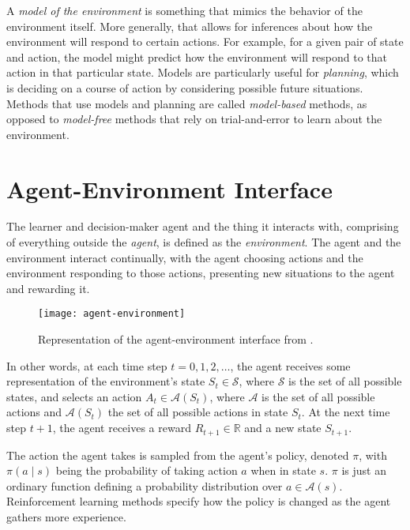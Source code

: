 A \textit{model of the environment} is something that mimics the behavior of the environment itself. More generally, that allows for inferences about how the environment will respond to certain actions. For example, for a given pair of state and action, the model might predict how the environment will respond to that action in that particular state. Models are particularly useful for \textit{planning}, which is deciding on a course of action by considering possible future situations. Methods that use models and planning are called \textit{model-based} methods, as opposed to \textit{model-free} methods that rely on trial-and-error to learn about the environment.

\section{Agent-Environment Interface}
The learner and decision-maker agent and the thing it interacts with, comprising of everything outside the \textit{agent}, is defined as the \textit{environment}. The agent and the environment interact continually, with the agent choosing actions and the environment responding to those actions, presenting new situations to the agent and rewarding it.

\begin{figure}[H]
    \texttt{[image: agent-environment]}
    \caption{Representation of the agent-environment interface from \cite{suttonbarto}.}
\end{figure}

In other words, at each time step $t = 0, 1, 2, \dots$, the agent receives some representation of the environment's state $S_t \in \mathcal{S}$, where $\mathcal{S}$ is the set of all possible states, and selects an action $A_t \in \mathcal{A}(S_t)$, where $\mathcal{A}$ is the set of all possible actions and $\mathcal{A}(S_t)$ the set of all possible actions in state $S_t$. At the next time step $t+1$, the agent receives a reward $R_{t+1} \in \mathbb{R}$ and a new state $S_{t+1}$. 

The action the agent takes is sampled from the agent's policy, denoted $\pi$, with $\pi(a \mid s)$ being the probability of taking action $a$ when in state $s$. $\pi$ is just an ordinary function defining a probability distribution over $a \in \mathcal{A}(s)$. Reinforcement learning methods specify how the policy is changed as the agent gathers more experience. 

\section{}